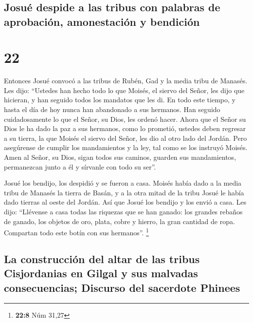 \hypertarget{josuuxe9-despide-a-las-tribus-con-palabras-de-aprobaciuxf3n-amonestaciuxf3n-y-bendiciuxf3n}{%
\subsection{Josué despide a las tribus con palabras de aprobación,
amonestación y
bendición}\label{josuuxe9-despide-a-las-tribus-con-palabras-de-aprobaciuxf3n-amonestaciuxf3n-y-bendiciuxf3n}}

\hypertarget{section-21}{%
\section{22}\label{section-21}}

 Entonces Josué convocó a las tribus de Rubén, Gad y la
media tribu de Manasés.  Les dijo: ``Ustedes han hecho
todo lo que Moisés, el siervo del Señor, les dijo que hicieran, y han
seguido todos los mandatos que les di.  En todo este
tiempo, y hasta el día de hoy nunca han abandonado a sus hermanos. Han
seguido cuidadosamente lo que el Señor, su Dios, les ordenó hacer.
 Ahora que el Señor su Dios le ha dado la paz a sus
hermanos, como lo prometió, ustedes deben regresar a su tierra, la que
Moisés el siervo del Señor, les dio al otro lado del Jordán.
 Pero asegúrense de cumplir los mandamientos y la ley, tal
como se los instruyó Moisés. Amen al Señor, su Dios, sigan todos sus
caminos, guarden sus mandamientos, permanezcan junto a él y sírvanle con
todo su ser''.

 Josué los bendijo, los despidió y se fueron a casa.
 Moisés había dado a la media tribu de Manasés la tierra
de Basán, y a la otra mitad de la tribu Josué le había dado tierras al
oeste del Jordán. Así que Josué los bendijo y los envió a casa.
 Les dijo: ``Llévense a casa todas las riquezas que se han
ganado: los grandes rebaños de ganado, los objetos de oro, plata, cobre
y hierro, la gran cantidad de ropa. Compartan todo este botín con sus
hermanos''. \footnote{\textbf{22:8} Núm 31,27}

\hypertarget{la-construcciuxf3n-del-altar-de-las-tribus-cisjordanias-en-gilgal-y-sus-malvadas-consecuencias-discurso-del-sacerdote-phinees}{%
\subsection{La construcción del altar de las tribus Cisjordanias en
Gilgal y sus malvadas consecuencias; Discurso del sacerdote
Phinees}\label{la-construcciuxf3n-del-altar-de-las-tribus-cisjordanias-en-gilgal-y-sus-malvadas-consecuencias-discurso-del-sacerdote-phinees}}

